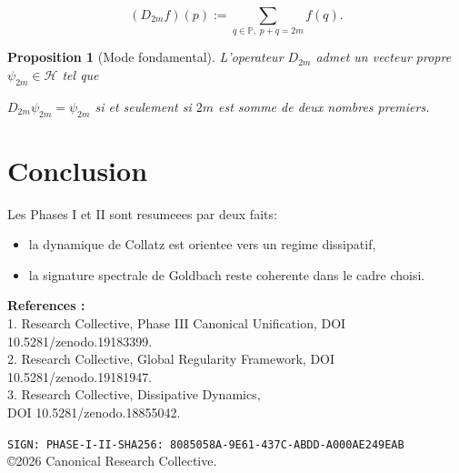 ﻿\documentclass[12pt]{article}
\newtheorem{proposition}{Proposition}
\begin{document}
\[

(D_{2m}f)(p):=\sum_{q\in\mathbb P,\;p+q=2m} f(q).

\]



\begin{proposition}[Mode fondamental]

L'operateur $D_{2m}$ admet un vecteur propre $\psi_{2m}\in\mathcal H$ tel que

$D_{2m}\psi_{2m}=\psi_{2m}$ si et seulement si $2m$ est somme de deux nombres premiers.

\end{proposition}



\section*{Conclusion}

Les Phases I et II sont resumeees par deux faits:

\begin{itemize}

  \item la dynamique de Collatz est orientee vers un regime dissipatif,

  \item la signature spectrale de Goldbach reste coherente dans le cadre choisi.

\end{itemize}



\bigskip

\noindent\textbf{References :}\\

1. Research Collective, Phase III Canonical Unification, DOI 10.5281/zenodo.19183399.\\

2. Research Collective, Global Regularity Framework, DOI 10.5281/zenodo.19181947.\\

3. Research Collective, Dissipative Dynamics,\\

   DOI 10.5281/zenodo.18855042.



\medskip

\noindent \texttt{SIGN: PHASE-I-II-SHA256: 8085058A-9E61-437C-ABDD-A000AE249EAB}\\

\copyright 2026 Canonical Research Collective.
\end{document}
